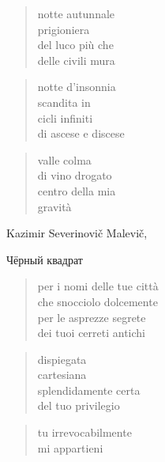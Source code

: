 \clearpage


	\begin{verse}
		notte autunnale\\
		prigioniera\\
		del luco più che\\
		delle civili mura
	\end{verse}

	\begin{verse}
		notte d'insonnia\\
		scandita in\\
		cicli infiniti\\
		di ascese e discese 
	\end{verse}

	\begin{verse}
		valle colma\\
		di vino drogato\\
		centro della mia\\
		gravità
	\end{verse}

\clearpage


\begin{artItem}
	Kazimir Severinovič Malevič, \begin{otherlanguage}{russian}%
		Чёрный квадрат%
	\end{otherlanguage}
\end{artItem}

	\begin{verse}
		per i nomi delle tue città\\
		che snocciolo dolcemente\\
		per le asprezze segrete\\
		dei tuoi cerreti antichi
	\end{verse}

	\begin{verse}
		dispiegata\\
		cartesiana\\
		splendidamente certa\\
		del tuo privilegio
	\end{verse}

	\begin{verse}
		tu irrevocabilmente\\
		mi appartieni
	\end{verse}
